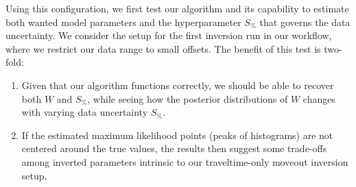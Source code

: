 Using this configuration, we first test our algorithm and its capability to estimate both wanted model parameters and the hyperparameter $S_{\%}$ that governs the data uncertainty. We consider the setup for the first inversion run in our workflow, where we restrict our data range to small offsets. The benefit of this test is two-fold:
\begin{enumerate}
    \item Given that our algorithm functions correctly, we should be able to recover both $W$ and $S_{\%}$, while seeing how the posterior distributions of $W$ changes with varying data uncertainty $S_{\%}$.
    \item If the estimated maximum likelihood points (peaks of histograms) are not centered around the true values, the results then suggest some trade-offs among inverted parameters intrinsic to our traveltime-only moveout inversion setup.
\end{enumerate}
